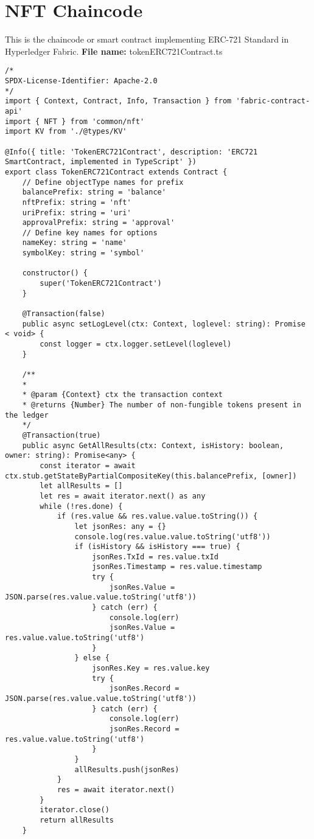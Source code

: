 \section{NFT Chaincode}
This is the chaincode or smart contract implementing
\ac{ERC}-721 Standard in Hyperledger Fabric.
\textbf{File name:} tokenERC721Contract.ts
\label{ERC271ChainCode}
\begin{lstlisting}
/*
SPDX-License-Identifier: Apache-2.0
*/
import { Context, Contract, Info, Transaction } from 'fabric-contract-api'
import { NFT } from 'common/nft'
import KV from './@types/KV'

@Info({ title: 'TokenERC721Contract', description: 'ERC721 SmartContract, implemented in TypeScript' })
export class TokenERC721Contract extends Contract {
    // Define objectType names for prefix
    balancePrefix: string = 'balance'
    nftPrefix: string = 'nft'
    uriPrefix: string = 'uri'
    approvalPrefix: string = 'approval'
    // Define key names for options
    nameKey: string = 'name'
    symbolKey: string = 'symbol'

    constructor() {
        super('TokenERC721Contract')
    }

    @Transaction(false)
    public async setLogLevel(ctx: Context, loglevel: string): Promise < void> {
        const logger = ctx.logger.setLevel(loglevel)
    }

    /**
    *
    * @param {Context} ctx the transaction context
    * @returns {Number} The number of non-fungible tokens present in the ledger
    */
    @Transaction(true)
    public async GetAllResults(ctx: Context, isHistory: boolean, owner: string): Promise<any> {
        const iterator = await ctx.stub.getStateByPartialCompositeKey(this.balancePrefix, [owner])
        let allResults = []
        let res = await iterator.next() as any
        while (!res.done) {
            if (res.value && res.value.value.toString()) {
                let jsonRes: any = {}
                console.log(res.value.value.toString('utf8'))
                if (isHistory && isHistory === true) {
                    jsonRes.TxId = res.value.txId
                    jsonRes.Timestamp = res.value.timestamp
                    try {
                        jsonRes.Value = JSON.parse(res.value.value.toString('utf8'))
                    } catch (err) {
                        console.log(err)
                        jsonRes.Value = res.value.value.toString('utf8')
                    }
                } else {
                    jsonRes.Key = res.value.key
                    try {
                        jsonRes.Record = JSON.parse(res.value.value.toString('utf8'))
                    } catch (err) {
                        console.log(err)
                        jsonRes.Record = res.value.value.toString('utf8')
                    }
                }
                allResults.push(jsonRes)
            }
            res = await iterator.next()
        }
        iterator.close()
        return allResults
    }


\end{lstlisting}
